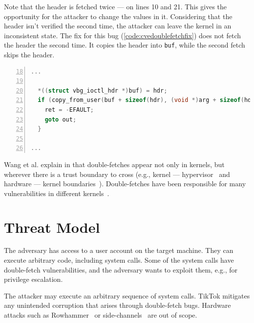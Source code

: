 \documentclass[conference]{IEEEtran}
\newcommand{\sysname}{TikTok}
\begin{document}
Note that the header is fetched twice --- on lines 10 and 21. This gives the
opportunity for the attacker to change the values in it. Considering
that the header isn't verified the second time, the attacker can
leave the kernel in an inconsistent state. The fix for this bug
(\autoref{code:cvedoublefetchfix}) does not fetch the header the second time. It
copies the header into \texttt{buf}, while the second fetch skips the header.

\begin{lstlisting}[language=C, caption=CVE-2018-12633 Double Fetch Fix~\cite{cve201812633fix},
  label=code:cvedoublefetchfix,  breaklines=true
  postbreak=\mbox{\textcolor{red}{$\hookrightarrow$}\space},
  numbers=left,basicstyle=\scriptsize, firstnumber=18, xleftmargin=5.0ex]
...

  *((struct vbg_ioctl_hdr *)buf) = hdr;
  if (copy_from_user(buf + sizeof(hdr), (void *)arg + sizeof(hdr), hdr.size_in - sizeof(hdr))) {
    ret = -EFAULT;
    goto out;
  }

...

\end{lstlisting}

Wang et al. explain in \cite{wang2018survey} that double-fetches appear not only
in kernels, but wherever there is a trust boundary to cross (e.g., kernel ---
hypervisor~\cite{wilhelm2016xenpwn} and hardware --- kernel
boundaries~\cite{lu2018untrusted}). Double-fetches have been responsible for many
vulnerabilities in different kernels~\cite{jurczyk2013bochspwn, wang2018survey}.


\section{Threat Model}
\label{sec:threatmodel}

The adversary has access to a user account on the target machine. They can
execute arbitrary code, including system calls. Some of the system calls
have double-fetch vulnerabilities, and the adversary wants to exploit them,
e.g., for privilege escalation.

The attacker may execute an arbitrary sequence of system calls. \sysname{}
mitigates any unintended corruption that arises through double-fetch bugs.
Hardware attacks such as Rowhammer~\cite{mutlu2019rowhammer} or
side-channels~\cite{kocher2019spectre} are out of scope.
\end{document}
